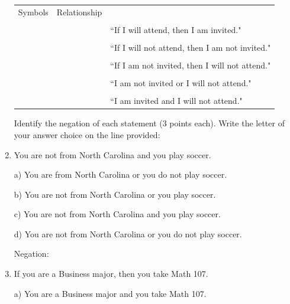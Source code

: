 \documentclass[12pt]{article}
\newcommand{\tab}{\hspace*{2em}}
\begin{document}
\begin{enumerate}
\begin{tabular}{lll}
Symbols & Relationship & \\
&&\\
\underline{\hspace{1.5 in}}&\underline{\hspace{1.5 in}}& ``If I will attend, then I am invited."\\
&&\\
\underline{\hspace{1.5 in}}&\underline{\hspace{1.5 in}}& ``If I will not attend, then I am not invited."\\
&&\\
\underline{\hspace{1.5 in}}&\underline{\hspace{1.5 in}}& ``If I am not invited, then I will not attend."\\
&&\\
\underline{\hspace{1.5 in}}&\underline{\hspace{1.5 in}}& ``I am not invited or I will not attend."\\
&&\\
\underline{\hspace{1.5 in}}&\underline{\hspace{1.5 in}}& ``I am invited and I will not attend."\\
\end{tabular}

\noindent Identify the negation of each statement (3 points each).  Write the letter of your answer choice on the line provided:

\item You are not from North Carolina and you play soccer.

\tab a)  You are from North Carolina or you do not play soccer.

\tab b) You are not from North Carolina or you play soccer.

\tab c) You are not from North Carolina and you play soccer.

\tab d) You are not from North Carolina or you do not play soccer.

Negation: \underline{\hspace{1.0 in}}


\item If you are a Business major, then you take Math 107.

\tab a) You are a Business major and you take Math 107.


\end{enumerate}
\end{document}
